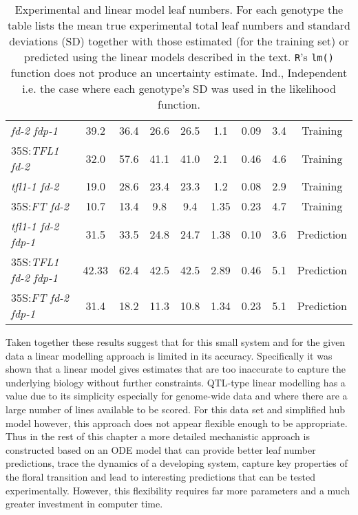 \begin{table*}[!htbp]
\begin{tabular}{@{}lcccccccc@{}}
      \emph{fd-2 fdp-1}          & 39.2  & 36.4 & 26.6 & 26.5 & 1.1  & 0.09 & 3.4 & Training \\
      35S:\emph{TFL1 fd-2}       & 32.0  & 57.6 & 41.1 & 41.0 & 2.1  & 0.46 & 4.6 & Training \\
      \emph{tfl1-1 fd-2}         & 19.0  & 28.6 & 23.4 & 23.3 & 1.2  & 0.08 & 2.9 & Training \\
      35S:\emph{FT fd-2}         & 10.7  & 13.4 & 9.8  & 9.4  & 1.35 & 0.23 & 4.7 & Training \\
      \emph{tfl1-1 fd-2 fdp-1}   & 31.5  & 33.5 & 24.8 & 24.7 & 1.38 & 0.10 & 3.6 & Prediction \\
      35S:\emph{TFL1 fd-2 fdp-1} & 42.33 & 62.4 & 42.5 & 42.5 & 2.89 & 0.46 & 5.1 & Prediction \\
      35S:\emph{FT fd-2 fdp-1}   & 31.4  & 18.2 & 11.3 & 10.8 & 1.34 & 0.23 & 5.1 & Prediction \\
      \bottomrule%
    \end{tabular}
    \caption{Experimental and linear model leaf numbers. For each genotype the table lists the mean true experimental total leaf numbers and standard deviations (SD) together with those estimated (for the training set) or predicted using the linear models described in the text.
      \texttt{R}'s \texttt{lm()} function does not produce an uncertainty estimate.
      Ind., Independent i.e\@. the case where each genotype's SD was used in the likelihood function.
    }
    \label{tab:lmLeafNums}
\end{table*}

Taken together these results suggest that for this small system and for the given data a linear modelling approach is limited in its accuracy.
Specifically it was shown that a linear model gives estimates that are too inaccurate to capture the underlying biology without further constraints.
QTL-type linear modelling has a value due to its simplicity especially for genome-wide data and where there are a large number of lines available to be scored.
For this data set and simplified hub model however, this approach does not appear flexible enough to be appropriate.
Thus in the rest of this chapter a more detailed mechanistic approach is constructed based on an ODE model that can provide better leaf number predictions, trace the dynamics of a developing system, capture key properties of the floral transition and lead to interesting predictions that can be tested experimentally.
However, this flexibility requires far more parameters and a much greater investment in computer time.

